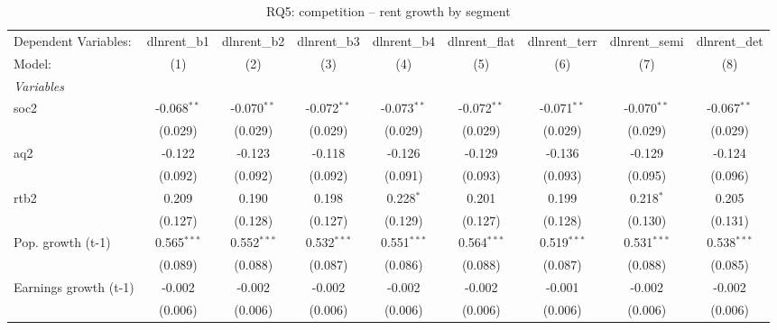 
\begin{table}[htbp]
   \caption{RQ5: competition -- rent growth by segment}
   \centering
   \begin{tabular}{lcccccccc}
      \tabularnewline \midrule \midrule
      Dependent Variables:          & dlnrent\_b1   & dlnrent\_b2   & dlnrent\_b3   & dlnrent\_b4   & dlnrent\_flat  & dlnrent\_terr  & dlnrent\_semi  & dlnrent\_det\\   
      Model:                        & (1)           & (2)           & (3)           & (4)           & (5)            & (6)            & (7)            & (8)\\  
      \midrule
      \emph{Variables}\\
      soc2                          & -0.068$^{**}$ & -0.070$^{**}$ & -0.072$^{**}$ & -0.073$^{**}$ & -0.072$^{**}$  & -0.071$^{**}$  & -0.070$^{**}$  & -0.067$^{**}$\\   
                                    & (0.029)       & (0.029)       & (0.029)       & (0.029)       & (0.029)        & (0.029)        & (0.029)        & (0.029)\\   
      aq2                           & -0.122        & -0.123        & -0.118        & -0.126        & -0.129         & -0.136         & -0.129         & -0.124\\   
                                    & (0.092)       & (0.092)       & (0.092)       & (0.091)       & (0.093)        & (0.093)        & (0.095)        & (0.096)\\   
      rtb2                          & 0.209         & 0.190         & 0.198         & 0.228$^{*}$   & 0.201          & 0.199          & 0.218$^{*}$    & 0.205\\   
                                    & (0.127)       & (0.128)       & (0.127)       & (0.129)       & (0.127)        & (0.128)        & (0.130)        & (0.131)\\   
      Pop. growth (t-1)             & 0.565$^{***}$ & 0.552$^{***}$ & 0.532$^{***}$ & 0.551$^{***}$ & 0.564$^{***}$  & 0.519$^{***}$  & 0.531$^{***}$  & 0.538$^{***}$\\   
                                    & (0.089)       & (0.088)       & (0.087)       & (0.086)       & (0.088)        & (0.087)        & (0.088)        & (0.085)\\   
      Earnings growth (t-1)         & -0.002        & -0.002        & -0.002        & -0.002        & -0.002         & -0.001         & -0.002         & -0.002\\   
                                    & (0.006)       & (0.006)       & (0.006)       & (0.006)       & (0.006)        & (0.006)        & (0.006)        & (0.006)\\   

\end{tabular}
\end{table}
